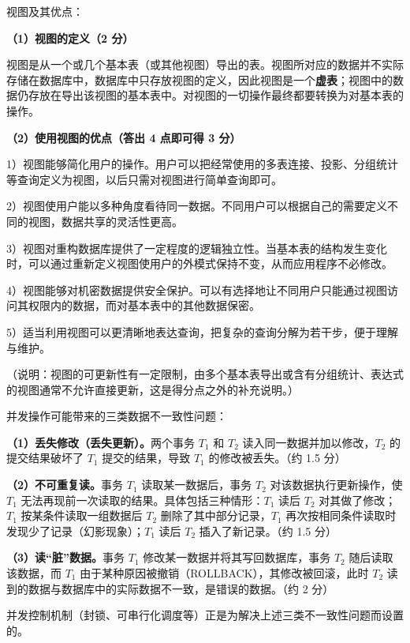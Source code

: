 \documentclass[a4paper,11pt]{article}
\begin{document}
\q 视图及其优点：
\begin{analysis}
\textbf{（1）视图的定义（2 分）}

视图是从一个或几个基本表（或其他视图）导出的表。视图所对应的数据并不实际存储在数据库中，数据库中只存放视图的定义，因此视图是一个\textbf{虚表}；视图中的数据仍存放在导出该视图的基本表中。对视图的一切操作最终都要转换为对基本表的操作。

\textbf{（2）使用视图的优点（答出 4 点即可得 3 分）}

1）视图能够简化用户的操作。用户可以把经常使用的多表连接、投影、分组统计等查询定义为视图，以后只需对视图进行简单查询即可。

2）视图使用户能以多种角度看待同一数据。不同用户可以根据自己的需要定义不同的视图，数据共享的灵活性更高。

3）视图对重构数据库提供了一定程度的逻辑独立性。当基本表的结构发生变化时，可以通过重新定义视图使用户的外模式保持不变，从而应用程序不必修改。

4）视图能够对机密数据提供安全保护。可以有选择地让不同用户只能通过视图访问其权限内的数据，而对基本表中的其他数据保密。

5）适当利用视图可以更清晰地表达查询，把复杂的查询分解为若干步，便于理解与维护。

（说明：视图的可更新性有一定限制，由多个基本表导出或含有分组统计、表达式的视图通常不允许直接更新，这是得分点之外的补充说明。）
\end{analysis}

\q 并发操作可能带来的三类数据不一致性问题：
\begin{analysis}
\textbf{（1）丢失修改（丢失更新）。}两个事务 $T_1$ 和 $T_2$ 读入同一数据并加以修改，$T_2$ 的提交结果破坏了 $T_1$ 提交的结果，导致 $T_1$ 的修改被丢失。（约 1.5 分）

\textbf{（2）不可重复读。}事务 $T_1$ 读取某一数据后，事务 $T_2$ 对该数据执行更新操作，使 $T_1$ 无法再现前一次读取的结果。具体包括三种情形：$T_1$ 读后 $T_2$ 对其做了修改；$T_1$ 按某条件读取一组数据后 $T_2$ 删除了其中部分记录，$T_1$ 再次按相同条件读取时发现少了记录（幻影现象）；$T_1$ 读后 $T_2$ 插入了新记录。（约 1.5 分）

\textbf{（3）读“脏”数据。}事务 $T_1$ 修改某一数据并将其写回数据库，事务 $T_2$ 随后读取该数据，而 $T_1$ 由于某种原因被撤销（ROLLBACK），其修改被回滚，此时 $T_2$ 读到的数据与数据库中的实际数据不一致，是错误的数据。（约 2 分）

并发控制机制（封锁、可串行化调度等）正是为解决上述三类不一致性问题而设置的。
\end{analysis}
\end{document}
